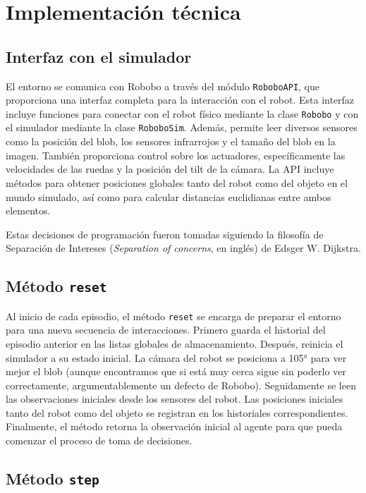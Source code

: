 \documentclass[12pt,a4paper]{article}
\begin{document}
\section{Implementación técnica}

\subsection{Interfaz con el simulador}

El entorno se comunica con Robobo a través del módulo \texttt{RoboboAPI}, que
proporciona una interfaz completa para la interacción con el robot. Esta
interfaz incluye funciones para conectar con el robot físico mediante la clase
\texttt{Robobo} y con el simulador mediante la clase \texttt{RoboboSim}. Además,
permite leer diversos sensores como la posición del blob, los sensores
infrarrojos y el tamaño del blob en la imagen. También proporciona control sobre
los actuadores, específicamente las velocidades de las ruedas y la posición del
tilt de la cámara. La API incluye métodos para obtener posiciones
globales tanto del robot como del objeto en el mundo simulado, así como para
calcular distancias euclidianas entre ambos elementos.

Estas decisiones de programación fueron tomadas siguiendo la filosofía de Separación de Intereses (\emph{Separation of concerns}, en inglés) de Edsger W. Dijkstra.

\subsection{Método \texttt{reset}}

Al inicio de cada episodio, el método \texttt{reset} se encarga de preparar el
entorno para una nueva secuencia de interacciones. Primero guarda el historial
del episodio anterior en las listas globales de almacenamiento. Después,
reinicia el simulador a su estado inicial. La
cámara del robot se posiciona a 105° para ver mejor el
blob (aunque encontramos que si está muy cerca sigue sin poderlo ver correctamente, argumentablemente un defecto de Robobo). Seguidamente se leen las observaciones iniciales desde los sensores del
robot. Las posiciones iniciales tanto del robot como del objeto se registran en
los historiales correspondientes. Finalmente, el método retorna la observación
inicial al agente para que pueda comenzar el proceso de toma de decisiones.

\subsection{Método \texttt{step}}
\end{document}
